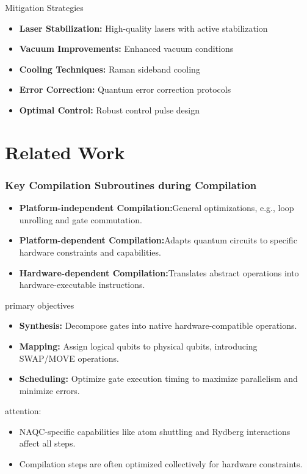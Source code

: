 \documentclass{beamer}
\begin{document}
\begin{frame}{Mitigation Strategies}
    \begin{itemize}
        \item \textbf{Laser Stabilization:} High-quality lasers with active stabilization
        \item \textbf{Vacuum Improvements:} Enhanced vacuum conditions
        \item \textbf{Cooling Techniques:} Raman sideband cooling
        \item \textbf{Error Correction:} Quantum error correction protocols
        \item \textbf{Optimal Control:} Robust control pulse design
    \end{itemize}
\end{frame}




\section{Related Work}
\begin{frame}[fragile]
\frametitle{Key Compilation Subroutines during Compilation}
\begin{itemize}
    \item \textbf{Platform-independent Compilation:}General optimizations, e.g., loop unrolling and gate commutation.
    \item \textbf{Platform-dependent Compilation:}Adapts quantum circuits to specific hardware constraints and capabilities.
    \item \textbf{Hardware-dependent Compilation:}Translates abstract operations into hardware-executable instructions.
\end{itemize}
\end{frame}
\begin{frame}{primary objectives}
\begin{itemize}
    \item \textbf{Synthesis:} Decompose gates into native hardware-compatible operations.
    \item \textbf{Mapping:} Assign logical qubits to physical qubits, introducing SWAP/MOVE operations.
    \item \textbf{Scheduling:} Optimize gate execution timing to maximize parallelism and minimize errors.
\end{itemize}
attention:
\begin{itemize}
    \item NAQC-specific capabilities like atom shuttling and Rydberg interactions affect all steps.
    \item Compilation steps are often optimized collectively for hardware constraints. 
\end{itemize}
\end{frame}
\end{document}
